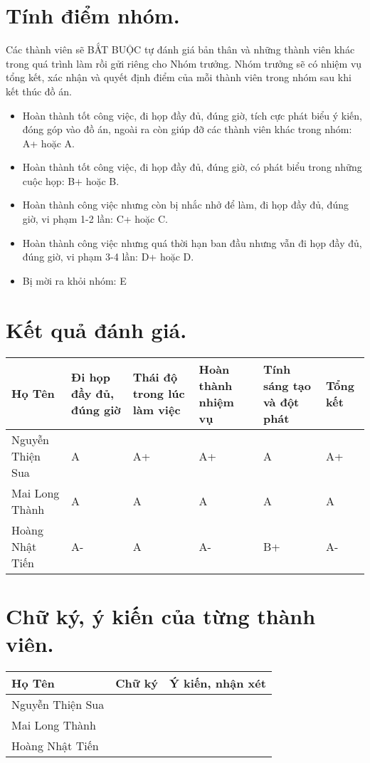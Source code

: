 \documentclass[12pt]{article}
\begin{document}
    \section{Tính điểm nhóm.}
Các thành viên sẽ BẮT BUỘC tự đánh giá bản thân và những thành viên khác trong quá trình làm rồi gửi riêng cho Nhóm trưởng. Nhóm trưởng sẽ có nhiệm vụ tổng kết, xác nhận và quyết định điểm của mỗi thành viên trong nhóm sau khi kết thúc đồ án.
\begin{itemize}
    \item Hoàn thành tốt công việc, đi họp đầy đủ, đúng giờ, tích cực phát biểu ý kiến, đóng góp vào đồ án, ngoài ra còn giúp đỡ các thành viên khác trong nhóm: A+ hoặc A.
    \item Hoàn thành tốt công việc, đi họp đầy đủ, đúng giờ, có phát biểu trong những cuộc họp: B+ hoặc B.
    \item Hoàn thành công việc nhưng còn bị nhắc nhở để làm, đi họp đầy đủ, đúng giờ, vi phạm 1-2 lần: C+ hoặc C.
    \item Hoàn thành công việc nhưng quá thời hạn ban đầu nhưng vẫn đi họp đầy đủ, đúng giờ, vi phạm 3-4 lần: D+ hoặc D.
    \item Bị mời ra khỏi nhóm: E
\end{itemize}
\section{Kết quả đánh giá.}
\begin{tabular}{|>{\raggedright\arraybackslash}p{2cm}|>{\raggedright\arraybackslash}p{2cm}|>{\raggedright\arraybackslash}p{2cm}|>{\raggedright\arraybackslash}p{2cm}|>{\raggedright\arraybackslash}p{2cm}|>{\raggedright\arraybackslash}p{2cm}|}
\hline
Họ Tên  & Đi họp đầy đủ, đúng giờ & Thái độ trong lúc làm việc & Hoàn thành nhiệm vụ & Tính sáng tạo và đột phát & Tổng kết  \\
\hline
Nguyễn Thiện Sua  
&
A
&
A+
&
A+
&
A
&
A+
\\  
\hline
Mai Long Thành  
&
A
&
A
&
A
&
A
&
A
\\  
\hline
Hoàng Nhật Tiến  
&
A-
&
A
&
A-
&
B+
&
A-
\\  
\hline
\end{tabular}
\section{Chữ ký, ý kiến của từng thành viên.}
\begin{tabular}{|>{\raggedright\arraybackslash}p{2cm}|>{\raggedright\arraybackslash}p{4cm}|>{\raggedright\arraybackslash}p{4cm}|}
\hline
Họ Tên  & Chữ ký & Ý kiến, nhận xét  \\
\hline
Nguyễn Thiện Sua
&

&

\\  
\hline
Mai Long Thành  
&

&

\\  
\hline
Hoàng Nhật Tiến 
&

&
\\  
\hline
\end{tabular}
\end{document}
